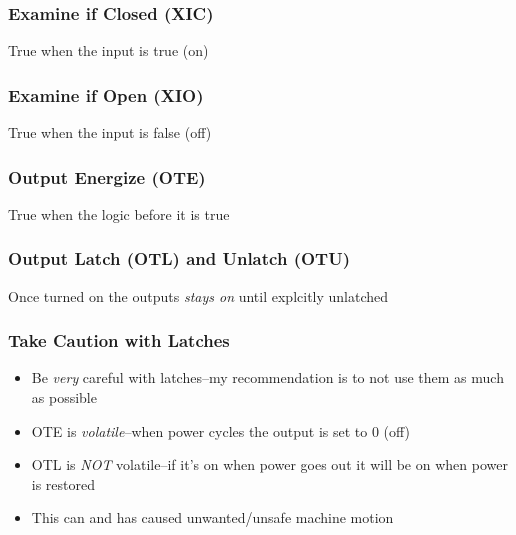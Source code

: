 \begin{frame}
    \frametitle{Examine if Closed (XIC)}

    \centering
    True when the input is true (on)

    \vspace{0.5in}

    
\end{frame}

\begin{frame}
    \frametitle{Examine if Open (XIO)}

    \centering
    True when the input is false (off)

    \vspace{0.5in}

    
\end{frame}

\begin{frame}
    \frametitle{Output Energize (OTE)}

    \centering
    True when the logic before it is true

    \vspace{0.5in}

        
\end{frame}

\begin{frame}
    \frametitle{Output Latch (OTL) and Unlatch (OTU)}

    \centering
    Once turned on the outputs \emph{stays on} until explcitly unlatched

    \vspace{0.375in}

    
\end{frame}

\begin{frame}
    \frametitle{Take Caution with Latches}

    \begin{itemize}
        \item Be \emph{very} careful with latches--my recommendation is to not use them as much as possible
        \item OTE is \emph{volatile}--when power cycles the output is set to 0 (off)
        \item OTL is \emph{NOT} volatile--if it's on when power goes out it will be on when power is restored
        \item This can and has caused unwanted/unsafe machine motion
    \end{itemize}
\end{frame}

